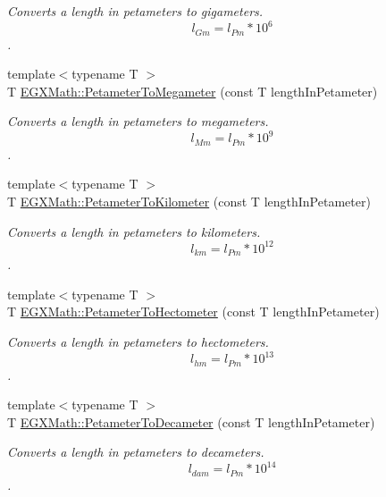 \begin{DoxyCompactItemize}
\begin{DoxyCompactList}\small\item\em Converts a length in petameters to gigameters. \[ l_{Gm}=l_{Pm} * 10^{6} \]. \end{DoxyCompactList}\item 
{\footnotesize template$<$typename T $>$ }\\T \mbox{\hyperlink{group___e_g_x_math-_conversions-_length_conversions-_s_i-_petameter-_s_i_gabee8390ae6476b4718cf82fc87ae7a1e}{E\+G\+X\+Math\+::\+Petameter\+To\+Megameter}} (const T length\+In\+Petameter)
\begin{DoxyCompactList}\small\item\em Converts a length in petameters to megameters. \[ l_{Mm}=l_{Pm} * 10^{9} \]. \end{DoxyCompactList}\item 
{\footnotesize template$<$typename T $>$ }\\T \mbox{\hyperlink{group___e_g_x_math-_conversions-_length_conversions-_s_i-_petameter-_s_i_gadf5a6ef57468284f06662fd7c59ad5ee}{E\+G\+X\+Math\+::\+Petameter\+To\+Kilometer}} (const T length\+In\+Petameter)
\begin{DoxyCompactList}\small\item\em Converts a length in petameters to kilometers. \[ l_{km}=l_{Pm} * 10^{12} \]. \end{DoxyCompactList}\item 
{\footnotesize template$<$typename T $>$ }\\T \mbox{\hyperlink{group___e_g_x_math-_conversions-_length_conversions-_s_i-_petameter-_s_i_ga18de0d328d6200590dd25a522ad1aeb4}{E\+G\+X\+Math\+::\+Petameter\+To\+Hectometer}} (const T length\+In\+Petameter)
\begin{DoxyCompactList}\small\item\em Converts a length in petameters to hectometers. \[ l_{hm}=l_{Pm} * 10^{13} \]. \end{DoxyCompactList}\item 
{\footnotesize template$<$typename T $>$ }\\T \mbox{\hyperlink{group___e_g_x_math-_conversions-_length_conversions-_s_i-_petameter-_s_i_gaf0fe67e33a48584d1f9f0ffa1ca4c8f9}{E\+G\+X\+Math\+::\+Petameter\+To\+Decameter}} (const T length\+In\+Petameter)
\begin{DoxyCompactList}\small\item\em Converts a length in petameters to decameters. \[ l_{dam}=l_{Pm} * 10^{14} \]. \end{DoxyCompactList}\item 

\end{DoxyCompactItemize}
